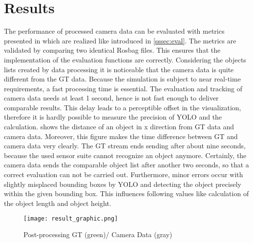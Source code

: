\section{Results}\label{Results}
	
	The performance of processed camera data can be evaluated with metrics presented in \cite{Reway} which are realized like introduced in \cref{sssec:eval}. The metrics are validated by comparing two identical Rosbag files. This ensures that the implementation of the evaluation functions are correctly.
	Considering the objects lists created by data processing it is noticeable that the camera data is quite different from the \ac{GT} data. Because the simulation is subject to near real-time requirements, a fast processing time is essential. The evaluation and tracking of camera data needs at least 1 second, hence is not fast enough to deliver comparable results. This delay leads to a perceptible offset in the visualization, therefore it is hardly possible to measure the precision of \ac{YOLO} and the calculation.
	 shows the distance of an object in x direction from \ac{GT} data and camera data. Moreover, this figure  makes the time difference between \ac{GT} and camera data very clearly. The \ac{GT} stream ends sending after about nine seconds, because the used sensor suite cannot recognize an object anymore. Certainly, the camera data  sends the comparable object list after another two seconds, so that a correct evaluation can not be carried out. Furthermore, minor errors occur with slightly misplaced bounding boxes by \ac{YOLO} and detecting the object precisely within the given bounding box. This influences following values like calculation of the object length and object height.\\
	\begin{figure}[b]
		\centering
		\texttt{[image: result\_graphic.png]}
		\caption{Post-processing GT (green)/ Camera Data (gray)}
		\label{fig:result}
	\end{figure}
%	
